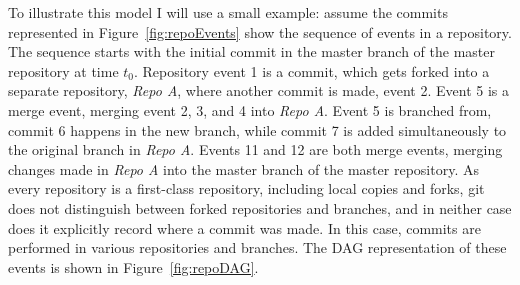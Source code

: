 To illustrate this model I will use a small example: assume the commits
represented in Figure~\ref{fig:repoEvents} show the sequence of events
in a repository. The sequence starts with the initial commit in the
master branch of the master repository at time $t_0$. Repository event 1
is a commit, which gets forked into a separate repository, \textit{Repo
  A}, where another commit is made, event 2. Event 5 is a merge event,
merging event 2, 3, and 4 into \textit{Repo A}. Event 5 is branched
from, commit 6 happens in the new branch, while commit 7 is added
simultaneously to the original branch in \textit{Repo A}. Events 11 and
12 are both merge events, merging changes made in \textit{Repo A} into
the master branch of the master repository. As every repository is a
first-class repository, including local copies and forks, git does not
distinguish between forked repositories and branches, and in neither
case does it explicitly record where a commit was made. In this case,
commits are performed in various repositories and branches. The DAG
representation of these events is shown in Figure~\ref{fig:repoDAG}.

